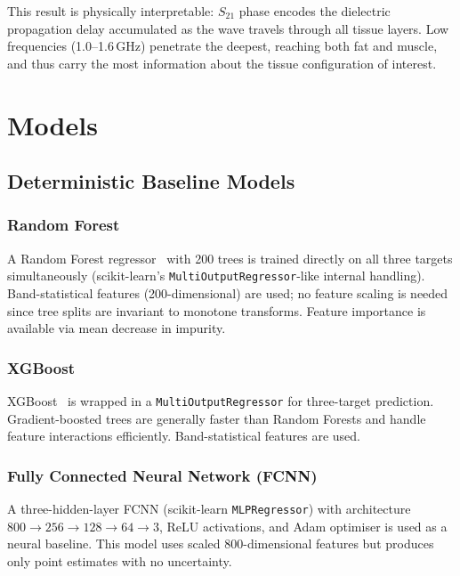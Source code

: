 \documentclass[12pt, a4paper, oneside]{report}
\begin{document}
This result is physically interpretable: $S_{21}$ phase encodes the dielectric propagation delay accumulated as the wave travels through all tissue layers. Low frequencies (1.0--1.6\,GHz) penetrate the deepest, reaching both fat and muscle, and thus carry the most information about the tissue configuration of interest.

\chapter{Models}
\label{ch:models}

\section{Deterministic Baseline Models}

\subsection{Random Forest}

A Random Forest regressor~\cite{breiman2001} with 200 trees is trained directly on all three targets simultaneously (scikit-learn's \texttt{MultiOutputRegressor}-like internal handling). Band-statistical features (200-dimensional) are used; no feature scaling is needed since tree splits are invariant to monotone transforms. Feature importance is available via mean decrease in impurity.

\subsection{XGBoost}

XGBoost~\cite{chen2016} is wrapped in a \texttt{MultiOutputRegressor} for three-target prediction. Gradient-boosted trees are generally faster than Random Forests and handle feature interactions efficiently. Band-statistical features are used.

\subsection{Fully Connected Neural Network (FCNN)}

A three-hidden-layer FCNN (scikit-learn \texttt{MLPRegressor}) with architecture $800 \to 256 \to 128 \to 64 \to 3$, ReLU activations, and Adam optimiser is used as a neural baseline. This model uses scaled 800-dimensional features but produces only point estimates with no uncertainty.
\end{document}
